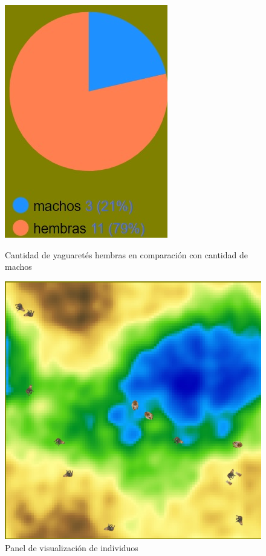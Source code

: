\documentclass{article}
\begin{document}
    \begin{figure}
        \centering
        \includegraphics{imagen2.jpg}
        \caption{Cantidad de yaguaretés hembras en comparación con cantidad de machos}
        \label{fig:my_label}
        
        \bigskip
    
        \centering
        \includegraphics{imagen3.jpg}
        \caption{Panel de visualización de individuos}
        \label{fig:my_label}
    
    \end{figure}
\end{document}

